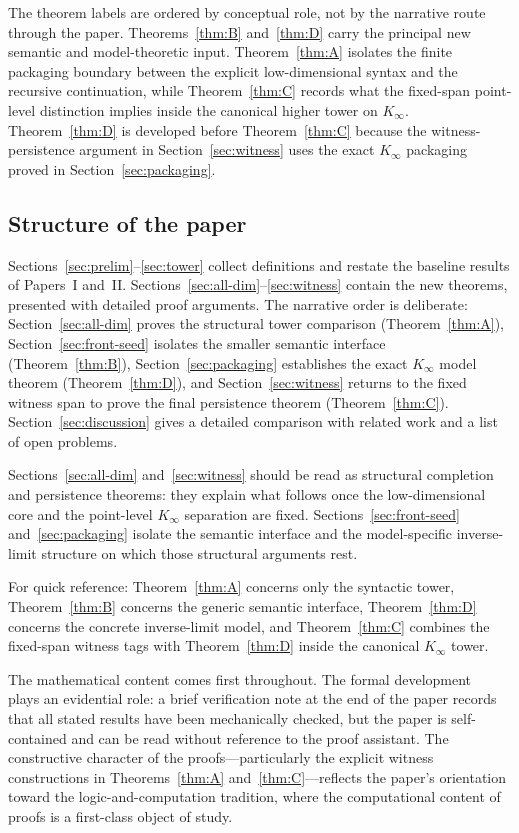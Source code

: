 \documentclass[webpdf,traditional,large,numbered]{oup-authoring-template}
\theoremstyle{thmstyleone}%
\theoremstyle{thmstyletwo}%
\theoremstyle{thmstylethree}%
\newcommand{\Kinf}{K_\infty}
\begin{document}
\noindent
The theorem labels are ordered by conceptual role, not by the narrative route
through the paper.  Theorems~\ref{thm:B} and~\ref{thm:D} carry the principal new
semantic and model-theoretic input.  Theorem~\ref{thm:A} isolates the finite
packaging boundary between the explicit low-dimensional syntax and the recursive
continuation, while Theorem~\ref{thm:C} records what the fixed-span point-level
distinction implies inside the canonical higher tower on $\Kinf$.
Theorem~\ref{thm:D} is developed before Theorem~\ref{thm:C} because the
witness-persistence argument in Section~\ref{sec:witness} uses the exact
$\Kinf$ packaging proved in Section~\ref{sec:packaging}.

\subsection{Structure of the paper}
Sections~\ref{sec:prelim}--\ref{sec:tower} collect definitions and
restate the baseline results of Papers~I and~II.
Sections~\ref{sec:all-dim}--\ref{sec:witness} contain the new theorems,
presented with detailed proof arguments.  The narrative order is deliberate:
Section~\ref{sec:all-dim} proves the structural tower comparison
(Theorem~\ref{thm:A}), Section~\ref{sec:front-seed} isolates the smaller
semantic interface (Theorem~\ref{thm:B}), Section~\ref{sec:packaging}
establishes the exact $\Kinf$ model theorem (Theorem~\ref{thm:D}), and
Section~\ref{sec:witness} returns to the fixed witness span to prove the final
persistence theorem (Theorem~\ref{thm:C}).  Section~\ref{sec:discussion} gives
a detailed comparison with related work and a list of open problems.

Sections~\ref{sec:all-dim} and~\ref{sec:witness} should be read as structural
completion and persistence theorems: they explain what follows once the
low-dimensional core and the point-level $\Kinf$ separation are fixed.
Sections~\ref{sec:front-seed} and~\ref{sec:packaging} isolate the semantic
interface and the model-specific inverse-limit structure on which those
structural arguments rest.

For quick reference: Theorem~\ref{thm:A} concerns only the syntactic tower,
Theorem~\ref{thm:B} concerns the generic semantic interface, Theorem~\ref{thm:D}
concerns the concrete inverse-limit model, and Theorem~\ref{thm:C} combines the
fixed-span witness tags with Theorem~\ref{thm:D} inside the canonical
$\Kinf$ tower.

The mathematical content comes first throughout.  The formal
development~\cite{Lean4} plays an evidential role: a brief verification note at
the end of the paper records that all stated results have been mechanically
checked, but the paper is self-contained and can be read without reference to
the proof assistant.
The constructive character of the proofs---particularly the explicit witness
constructions in Theorems~\ref{thm:A} and~\ref{thm:C}---reflects the paper's
orientation toward the logic-and-computation tradition, where the computational
content of proofs is a first-class object of study.
\end{document}
